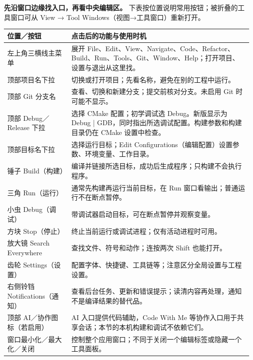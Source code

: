 \textbf{先沿窗口边缘找入口，再看中央编辑区。} 下表按位置说明常用按钮；被折叠的工具窗口可从 View → Tool Windows（视图→工具窗口）重新打开。
\begingroup\small
\begin{longtable}{p{}p{}}
\toprule[1.5pt]
位置／按钮 & 点击后的功能与使用时机\\
\midrule[1pt]\endhead
左上角三横线主菜单 & 展开 File、Edit、View、Navigate、Code、Refactor、Build、Run、Tools、Git、Window、Help；打开项目、设置与退出从这里找。\\
顶部项目名下拉 & 切换或打开项目；先看名称，避免在别的工程中运行。\\
顶部 Git 分支名 & 查看、切换和新建分支；提交前核对分支。未启用 Git 时可能不显示。\\
顶部 Debug／Release 下拉 & 选择 CMake 配置；初学调试选 Debug。新版显示为 Debug | GDB，同时指出所选调试配置。构建参数和构建目录仍在 CMake 设置中检查。\\
顶部目标名下拉 & 选择运行目标；Edit Configurations（编辑配置）设置参数、环境变量、工作目录。\\
锤子 Build（构建） & 编译并链接所选目标，成功后生成程序；只构建不会执行程序。\\
三角 Run（运行） & 通常先构建再运行当前目标，在 Run 窗口看输出；普通运行不在断点暂停。\\
小虫 Debug（调试） & 带调试器启动目标，可在断点暂停并观察变量。\\
方块 Stop（停止） & 终止当前运行或调试进程；仅有活动进程时可用。\\
放大镜 Search Everywhere & 查找文件、符号和动作；连按两次 Shift 也能打开。\\
齿轮 Settings（设置） & 配置字体、快捷键、工具链等；注意区分全局设置与工程设置。\\
右侧铃铛 Notifications（通知） & 查看后台任务、更新和错误提示；读清内容再处理，通知不是编译结果的替代品。\\
顶部 AI／协作图标（若启用） & AI 入口提供代码辅助，Code With Me 等协作入口用于共享会话；本节的本机构建和调试不依赖它们。\\
窗口最小化／最大化／关闭 & 控制整个应用窗口；不同于关闭一个编辑标签或隐藏一个工具面板。\\
\bottomrule[1.5pt]
\end{longtable}\endgroup

